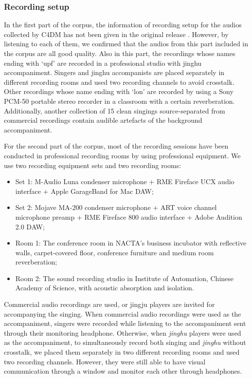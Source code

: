 \subsubsection{Recording setup}\label{sec:ch4:recording_setup}

In the first part of the corpus, the information of recording setup for the audios collected by C4DM has not been given in the original release \cite{Black2014}. However, by listening to each of them, we confirmed that the audios from this part included in the corpus are all good quality. Also in this part, the recordings whose names ending with `upf' are recorded in a professional studio with jinghu accompaniment. Singers and jinghu accompanists are placed separately in different recording rooms and used two recording channels to avoid crosstalk. Other recordings whose name ending with `lon' are recorded by using a Sony PCM-50 portable stereo recorder in a classroom with a certain reverberation. Additionally, another collection of 15 clean singings source-separated from commercial recordings contain audible artefacts of the background accompaniment.

For the second part of the corpus, most of the recording sessions have been conducted in professional recording rooms by using professional equipment. We use two recording equipment sets and two recording rooms:

\begin{itemize}[itemsep=0pt]
    \item Set 1: M-Audio Luna condenser microphone + RME Fireface UCX audio interface + Apple GarageBand for Mac DAW;
    \item Set 2: Mojave MA-200 condenser microphone + ART voice channel microphone preamp + RME Fireface 800 audio interface + Adobe Audition 2.0 DAW;
    \item Room 1: The conference room in \gls{NACTA}'s business incubator with reflective walls, carpet-covered floor, conference furniture and medium room reverberation;
    \item Room 2: The sound recording studio in Institute of Automation, Chinese Academy of Science, with acoustic absorption and isolation.
\end{itemize}

Commercial audio recordings are used, or jingju players are invited for accompanying the singing. When commercial audio recordings were used as the accompaniment, singers were recorded while listening to the accompaniment sent through their monitoring headphone. Otherwise, when \textit{jinghu} players were used as the accompaniment, to simultaneously record both singing and \textit{jinghu} without crosstalk, we placed them separately in two different recording rooms and used two recording channels. However, they were still able to have visual communication through a window and monitor each other through headphones.

